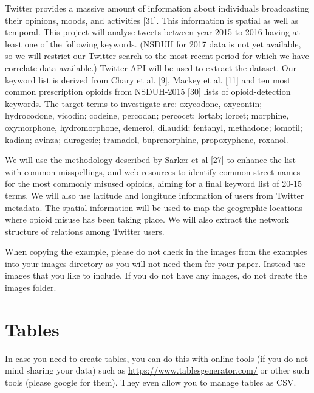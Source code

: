 \documentclass[sigconf]{acmart}
\begin{document}
Twitter provides a massive amount of information about individuals broadcasting their opinions, moods, and activities [31]. This information is spatial as well as temporal. This project will analyse tweets between year 2015 to 2016 having at least one of the following keywords. (NSDUH for 2017 data is not yet available, so we will restrict our Twitter search to the most recent period for which we have correlate data available.) Twitter API will be used to extract the dataset. Our keyword list is derived from Chary et al. [9],  Mackey et al. [11] and ten most common prescription opioids from NSDUH-2015 [30] lists of opioid-detection keywords. The target terms to investigate are: oxycodone, oxycontin; hydrocodone, vicodin; codeine, percodan; percocet; lortab; lorcet; morphine, oxymorphone, hydromorphone, demerol, dilaudid; fentanyl, methadone; lomotil; kadian; avinza; duragesic; tramadol, buprenorphine, propoxyphene, roxanol.

We will use the methodology described by Sarker et al [27] to enhance the list with common misspellings, and web resources to identify common street names for the most commonly misused opioids, aiming for a final keyword list of 20-15 terms. We will also use latitude and longitude information of users from Twitter metadata. The spatial information will be used to map the geographic locations where opioid misuse has been taking place. We will also extract the network structure of relations among Twitter users. 




When copying the example, please do not check in the images from the
examples into your images directory as you will not need them for your
paper. Instead use images that you like to include. If you do not have
any images, do not dreate the images folder.

\section{Tables}

In case you need to create tables, you can do this with online tools
(if you do not mind sharing your data) such as
\url{https://www.tablesgenerator.com/} or other such tools (please
google for them). They even allow you to manage tables as CSV.
\end{document}
